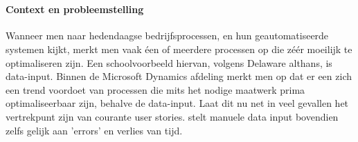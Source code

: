 
\chapter{}
\label{ch:inleiding}



\section{}
\label{sec:probleemstelling}

\subsubsection{Context en probleemstelling}
Wanneer men naar hedendaagse bedrijfsprocessen, en hun geautomatiseerde systemen kijkt, merkt men vaak éen of meerdere processen op die zéér moeilijk te optimaliseren zijn. Een schoolvoorbeeld hiervan, volgens Delaware althans, is data-input. Binnen de Microsoft Dynamics afdeling merkt men op dat er een zich een trend voordoet van processen die mits het nodige maatwerk prima optimaliseerbaar zijn, behalve de data-input. Laat dit nu net in veel gevallen het vertrekpunt zijn van courante user stories. \textcite{TimeXtender2019} stelt manuele data input bovendien zelfs gelijk aan 'errors' en verlies van tijd.

